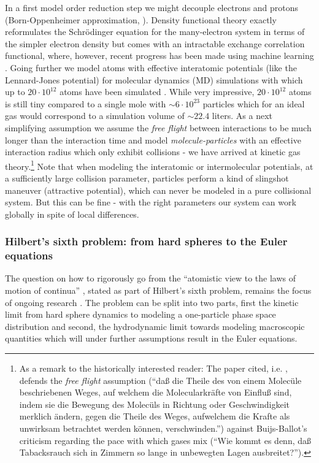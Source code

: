 In a first model order reduction step we might decouple electrons and protons
(Born-Oppenheimer approximation, \cite{gherghe25}). Density functional
theory exactly reformulates the Schrödinger equation for the
many-electron system in terms of the simpler electron density
but comes with an intractable exchange correlation functional,
where, however, recent progress has been made using machine learning \citep{luise25}. 
Going further we model atoms
with effective interatomic potentials (like the Lennard-Jones potential)
for molecular dynamics (MD) simulations with which up to $20 \cdot 10^{12}$
atoms have been simulated \citep{twetris}. While very impressive, $20 \cdot 10^{12}$
atoms is still tiny compared to a single mole with $\sim 6\cdot10^{23}$ particles which for
an ideal gas would correspond to a simulation volume of $\sim 22.4$ liters. As a next
simplifying assumption we assume the \textit{free flight} between interactions to be much longer
than the interaction time \citep{clausius58} and model \textit{molecule-particles} with an effective interaction
radius which only exhibit collisions - we have arrived at kinetic gas theory.\footnote{
As a remark to the historically interested reader: The paper cited, i.e. \cite{clausius58}, defends 
the \textit{free flight} assumption (\enquote{daß die Theile des von einem Molecüle 
beschriebenen Weges, auf welchem die Molecularkräfte von Einfluß sind, 
indem sie die Bewegung des Molecüls in Richtung oder 
Geschwindigkeit merklich ändern, gegen die Theile des Weges, 
aufwelchem die Krafte als unwirksam betrachtet werden können, verschwinden.}) against Buijs-Ballot's
criticism regarding the pace with which gases mix
(\enquote{Wie kommt es denn, daß Tabacksrauch sich in Zimmern so lange in unbewegten Lagen ausbreitet?}).}
Note that when modeling 
the interatomic or intermolecular potentials, at a sufficiently large collision parameter, particles
perform a kind of slingshot maneuver (attractive potential), which can never be modeled 
in a pure collisional system. But this can be fine - with the right parameters our system can
work globally in spite of local differences. 

\subsubsection{Hilbert's sixth problem: from hard spheres to the Euler equations}

The question on how to rigorously go from the \enquote{atomistic view to the laws 
of motion of continua} \citep{hilbert19}, stated as part of Hilbert's sixth problem,
remains the focus of ongoing research \citep{deng25}. The problem can be split into
two parts, first the kinetic limit from hard sphere dynamics to modeling a one-particle
phase space distribution and second, the hydrodynamic limit towards modeling macroscopic
quantities which will under further assumptions result in the Euler equations.

